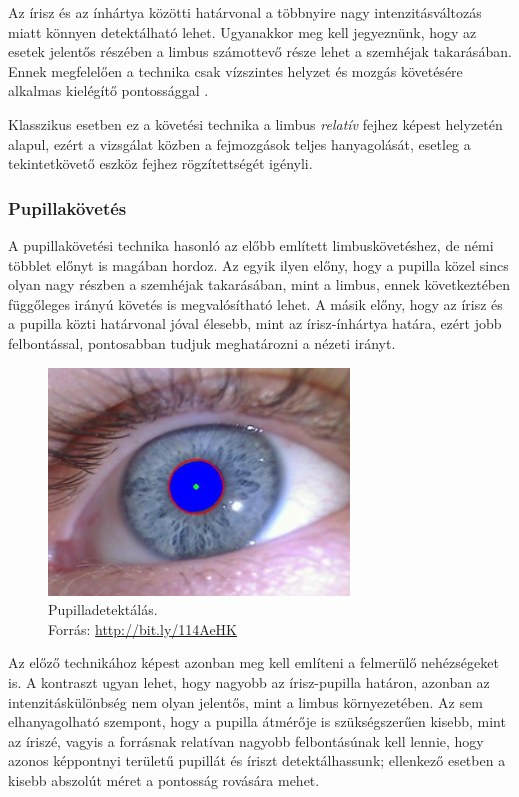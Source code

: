Az írisz és az ínhártya közötti határvonal a többnyire nagy intenzitásváltozás miatt könnyen detektálható lehet. Ugyanakkor meg kell jegyeznünk, hogy az esetek jelentős részében a limbus számottevő része lehet a szemhéjak takarásában. Ennek megfelelően a technika csak vízszintes helyzet és mozgás követésére alkalmas kielégítő pontossággal \cite{scott}.

Klasszikus esetben ez a követési technika a limbus \emph{relatív} fejhez képest helyzetén alapul, ezért a vizsgálat közben a fejmozgások teljes hanyagolását, esetleg a tekintetkövető eszköz fejhez rögzítettségét igényli.

\subsubsection{Pupillakövetés}\label{sect:pupilla}

A pupillakövetési technika hasonló az előbb említett limbuskövetéshez, de némi többlet előnyt is magában hordoz. Az egyik ilyen előny, hogy a pupilla közel sincs olyan nagy részben a szemhéjak takarásában, mint a limbus, ennek következtében függőleges irányú követés is megvalósítható lehet. A másik előny, hogy az írisz és a pupilla közti határvonal jóval élesebb, mint az írisz-ínhártya határa, ezért jobb felbontással, pontosabban tudjuk meghatározni a nézeti irányt.

\begin{figure}[!ht]
\centering
\includegraphics[width=80mm, keepaspectratio]{figures/pupil_tracking.jpg}
\caption{Pupilladetektálás.\\Forrás: \url{http://bit.ly/114AeHK}}
\label{fig:pupiltrack}
\end{figure}

Az előző technikához képest azonban meg kell említeni a felmerülő nehézségeket is. A kontraszt ugyan lehet, hogy nagyobb az írisz-pupilla határon, azonban az intenzitáskülönbség nem olyan jelentős, mint a limbus környezetében. Az sem elhanyagolható szempont, hogy a pupilla átmérője is szükségszerűen kisebb, mint az íriszé, vagyis a forrásnak relatívan nagyobb felbontásúnak kell lennie, hogy azonos képpontnyi területű pupillát és íriszt detektálhassunk; ellenkező esetben a kisebb abszolút méret a pontosság rovására mehet.

